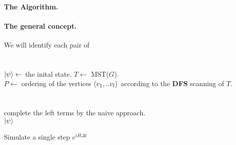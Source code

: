 \documentclass{article}
\begin{document}
      \paragraph{The Algorithm.}

      \paragraph{The general concept.} We will identify each pair of  


      \paragraph{}

      \begin{algorithm}[H]
	\SetAlgoLined
	\ \\ 
	\( \ket{\psi} \leftarrow \) the inital state.
	\(T  \leftarrow\) MST(\(G\)). \\
	\(P \leftarrow \) ordering of the vertices \( \braket{v_{1} , .. v_{l}}\) according to the \textbf{DFS} scanning of \(T\). \\
	\ \\ 
	\ \\
	complete the left terms by the naive approach. \\
	\Return \( \ket{\psi} \)
	\caption{Simulate a single step \(e^{iH\Delta t}\)}
      \end{algorithm}
\end{document}
